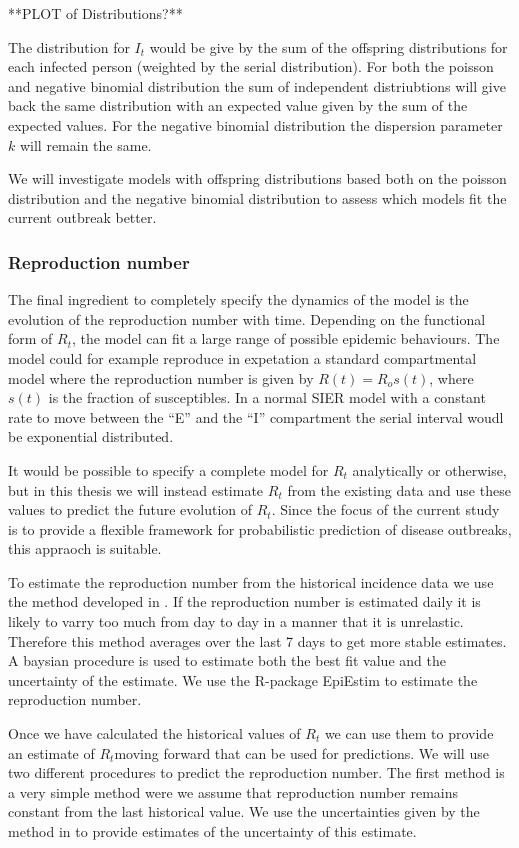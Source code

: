 \documentclass[12pt]{article}
\begin{document}
**PLOT of Distributions?**


The distribution for $I_t$ would be give by the sum of the offspring distributions for each infected person (weighted by the serial distribution). For both the poisson and negative binomial distribution the sum of independent distriubtions will give back the same distribution with an expected value given by the sum of the expected values. For the negative binomial distribution the dispersion parameter $k$ will remain the same. 

We will investigate models with offspring distributions based both on the poisson distribution and the negative binomial distribution to assess which models fit the current outbreak better.

\subsubsection{Reproduction number}
The final ingredient to completely specify the dynamics of the model is the evolution of the reproduction number with time. Depending on the functional form of $R_t$, the model can fit a large range of possible epidemic behaviours. The model could for example reproduce in expetation a standard compartmental model where the reproduction number is given by $R(t) = R_os(t)$, where $s(t)$ is the fraction of susceptibles. In a normal SIER model with a constant rate to move between the ``E'' and the ``I'' compartment the serial interval woudl be exponential distributed.

It would be possible to specify a complete model for $R_t$ analytically or otherwise, but in this thesis we will instead estimate $R_t$ from the existing data and use these values to predict the future evolution of $R_t$. Since the focus of the current study is to provide a flexible framework for probabilistic prediction of disease outbreaks, this appraoch is suitable.

To estimate the reproduction number from the historical incidence data we use the method developed in \cite{coriNewFrameworkSoftware2013}. If the reproduction number is estimated daily it is likely to varry too much from day to day in a manner that it is unrelastic. Therefore this method averages over the last 7 days to get more stable estimates. A baysian procedure is used to estimate both the best fit value and the uncertainty of the estimate. We use the R-package EpiEstim \cite{coriEpiEstimEpiEstimPackage2013} to estimate the reproduction number. 

Once we have calculated the historical values of $R_t$ we can use them to provide an estimate of $R_t$moving forward that can be used for predictions. We will use two different procedures to predict the reproduction number. The first method is a very simple method were we assume that reproduction number remains constant from the last historical value. We use the uncertainties given by the method in \cite{coriNewFrameworkSoftware2013} to provide estimates of the uncertainty of this estimate.
\end{document}
